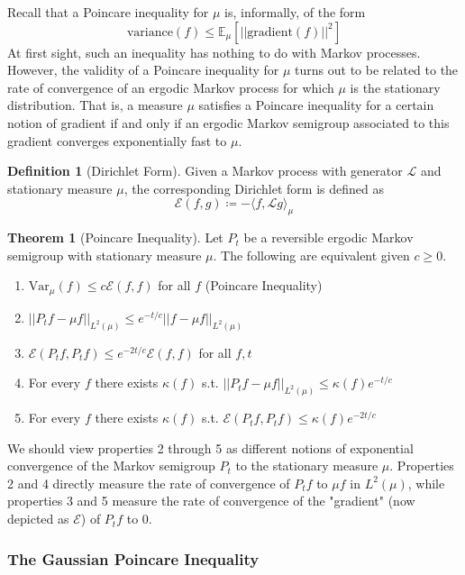 \documentclass{article}
\theoremstyle{definition}
\newtheorem{theorem}{Theorem}[section]
\theoremstyle{remark}
\theoremstyle{definition}
\newtheorem{definition}{Definition}[section]
\begin{document}
Recall that a Poincare inequality for $\mu$ is, informally, of the form 
\[\mathrm{variance}(f) \leq \mathbb{E}_\mu[ ||\mathrm{gradient}(f)||^2 ]\]
At first sight, such an inequality has nothing to do with Markov processes. However, the validity of a Poincare inequality for $\mu$ turns out to be related to the rate of convergence of an ergodic Markov process for which $\mu$ is the stationary distribution. That is, a measure $\mu$ satisfies a Poincare inequality for a certain notion of gradient if and only if an ergodic Markov semigroup associated to this gradient converges exponentially fast to $\mu$. 

\begin{definition}[Dirichlet Form]
Given a Markov process with generator $\mathscr{L}$ and stationary measure $\mu$, the corresponding Dirichlet form is defined as 
\[\mathcal{E}(f, g) \coloneqq - \langle f, \mathscr{L} g \rangle_\mu\]
\end{definition}

\begin{theorem}[Poincare Inequality]
Let $P_t$ be a reversible ergodic Markov semigroup with stationary measure $\mu$. The following are equivalent given $c \geq 0$. 
\begin{enumerate}
    \item $\mathrm{Var}_\mu (f) \leq c \mathcal{E}(f, f)$ for all $f$ (Poincare Inequality) 
    \item $||P_t f - \mu f||_{L^2 (\mu)} \leq e^{-t /c} ||f - \mu f||_{L^2 (\mu)}$
    \item $\mathcal{E}(P_t f, P_t f) \leq e^{-2t /c} \mathcal{E}(f, f)$ for all $f, t$
    \item For every $f$ there exists $\kappa (f)$ s.t. $||P_t f - \mu f||_{L^2 (\mu)} \leq \kappa(f) e^{-t/c}$
    \item For every $f$ there exists $\kappa (f)$ s.t. $\mathcal{E}(P_t f, P_t f) \leq \kappa(f) e^{-2t/c}$ 
\end{enumerate}
\end{theorem}

We should view properties 2 through 5 as different notions of exponential convergence of the Markov semigroup $P_t$ to the stationary measure $\mu$. Properties 2 and 4 directly measure the rate of convergence of $P_t f$ to $\mu f$ in $L^2 (\mu)$, while properties 3 and 5 measure the rate of convergence of the "gradient" (now depicted as $\mathcal{E}$) of $P_t f$ to $0$. 

\subsubsection{The Gaussian Poincare Inequality}
\end{document}
